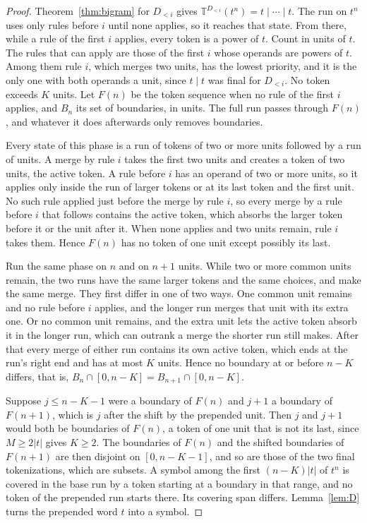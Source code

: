 \documentclass[11pt,a4paper]{article}
\theoremstyle{definition}
\theoremstyle{plain}
\newcommand{\T}{\mathbb{T}}
\begin{document}
\begin{proof}
Theorem~\ref{thm:bigram} for \(D_{<i}\) gives \(\T^{D_{<i}}(t^n) = t \mid \cdots \mid t\). The run on \(t^n\) uses only
rules before \(i\) until none applies, so it reaches that state. From there, while a rule of the first \(i\) applies,
every token is a power of \(t\). Count in units of \(t\). The rules that can apply are those of the first \(i\) whose
operands are powers of \(t\). Among them rule \(i\), which merges two units, has the lowest priority, and it is the only
one with both operands a unit, since \(t \mid t\) was final for \(D_{<i}\). No token exceeds \(K\) units. Let \(F(n)\)
be the token sequence when no rule of the first \(i\) applies, and \(B_n\) its set of boundaries, in units. The full run
passes through \(F(n)\), and whatever it does afterwards only removes boundaries.

Every state of this phase is a run of tokens of two or more units followed by a run of units. A merge by rule \(i\)
takes the first two units and creates a token of two units, the active token. A rule before \(i\) has an operand of two
or more units, so it applies only inside the run of larger tokens or at its last token and the first unit. No such rule
applied just before the merge by rule \(i\), so every merge by a rule before \(i\) that follows contains the active
token, which absorbs the larger token before it or the unit after it. When none applies and two units remain, rule \(i\)
takes them. Hence \(F(n)\) has no token of one unit except possibly its last.

Run the same phase on \(n\) and on \(n + 1\) units. While two or more common units remain, the two runs have the same
larger tokens and the same choices, and make the same merge. They first differ in one of two ways. One common unit
remains and no rule before \(i\) applies, and the longer run merges that unit with its extra one. Or no common unit
remains, and the extra unit lets the active token absorb it in the longer run, which can outrank a merge the shorter run
still makes. After that every merge of either run contains its own active token, which ends at the run's right end and
has at most \(K\) units. Hence no boundary at or before \(n - K\) differs, that is,
\(B_n \cap [0, n - K] = B_{n+1} \cap [0, n - K]\).

Suppose \(j \le n - K - 1\) were a boundary of \(F(n)\) and \(j + 1\) a boundary of \(F(n + 1)\), which is \(j\) after
the shift by the prepended unit. Then \(j\) and \(j + 1\) would both be boundaries of \(F(n)\), a token of one unit that
is not its last, since \(M \ge 2|t|\) gives \(K \ge 2\). The boundaries of \(F(n)\) and the shifted boundaries of
\(F(n + 1)\) are then disjoint on \([0, n - K - 1]\), and so are those of the two final tokenizations, which are
subsets. A symbol among the first \((n - K)|t|\) of \(t^n\) is covered in the base run by a token starting at a boundary
in that range, and no token of the prepended run starts there. Its covering span differs. Lemma~\ref{lem:D} turns the
prepended word \(t\) into a symbol.
\end{proof}
\end{document}
